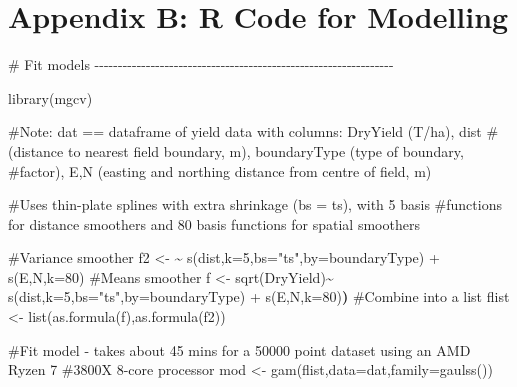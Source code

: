 \documentclass[]{elsarticle} %
\newenvironment{Shaded}{}{}
\newcommand{\AttributeTok}[1]{#1}
\newcommand{\CommentTok}[1]{\textcolor[rgb]{0.00,0.50,0.00}{#1}}
\newcommand{\ErrorTok}[1]{\textcolor[rgb]{1.00,0.00,0.00}{\textbf{#1}}}
\newcommand{\FunctionTok}[1]{#1}
\newcommand{\NormalTok}[1]{#1}
\newcommand{\OtherTok}[1]{\textcolor[rgb]{1.00,0.25,0.00}{#1}}
\newcommand{\StringTok}[1]{\textcolor[rgb]{0.00,0.50,0.50}{#1}}
\begin{document}
\hypertarget{appendix-b-r-code-for-modelling}{%
\section*{Appendix B: R Code for Modelling}\label{appendix-b-r-code-for-modelling}}

\begin{Shaded}
\begin{Highlighting}[]
\CommentTok{\# Fit models {-}{-}{-}{-}{-}{-}{-}{-}{-}{-}{-}{-}{-}{-}{-}{-}{-}{-}{-}{-}{-}{-}{-}{-}{-}{-}{-}{-}{-}{-}{-}{-}{-}{-}{-}{-}{-}{-}{-}{-}{-}{-}{-}{-}{-}{-}{-}{-}{-}{-}{-}{-}{-}{-}{-}{-}{-}{-}{-}{-}{-}{-}{-}{-}}

\FunctionTok{library}\NormalTok{(mgcv)}

\CommentTok{\#Note: dat == dataframe of yield data with columns: DryYield (T/ha), dist}
\CommentTok{\#(distance to nearest field boundary, m), boundaryType (type of boundary,}
\CommentTok{\#factor), E,N (easting and northing distance from centre of field, m)}

\CommentTok{\#Uses thin{-}plate splines with extra shrinkage (bs = \textquotesingle{}ts\textquotesingle{}), with 5 basis}
\CommentTok{\#functions for distance smoothers and 80 basis functions for spatial smoothers}

\CommentTok{\#Variance smoother}
\NormalTok{f2 }\OtherTok{\textless{}{-}} \StringTok{\textquotesingle{}\textasciitilde{} s(dist,k=5,bs="ts",by=boundaryType) + s(E,N,k=80)\textquotesingle{}} 
\CommentTok{\#Means smoother}
\NormalTok{f }\OtherTok{\textless{}{-}} \StringTok{\textquotesingle{}sqrt(DryYield)\textasciitilde{} s(dist,k=5,bs="ts",by=boundaryType) + s(E,N,k=80)\textquotesingle{}}\ErrorTok{)} 
\CommentTok{\#Combine into a list}
\NormalTok{flist }\OtherTok{\textless{}{-}} \FunctionTok{list}\NormalTok{(}\FunctionTok{as.formula}\NormalTok{(f),}\FunctionTok{as.formula}\NormalTok{(f2)) }

\CommentTok{\#Fit model {-} takes about 45 mins for a 50000 point dataset using an AMD Ryzen 7}
\CommentTok{\#3800X 8{-}core processor}
\NormalTok{mod }\OtherTok{\textless{}{-}} \FunctionTok{gam}\NormalTok{(flist,}\AttributeTok{data=}\NormalTok{dat,}\AttributeTok{family=}\FunctionTok{gaulss}\NormalTok{()) }
\end{Highlighting}
\end{Shaded}
\end{document}
